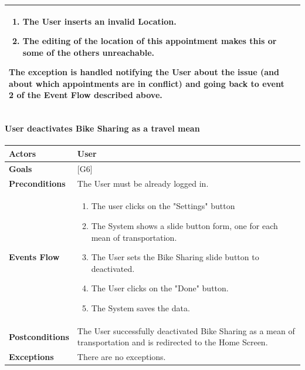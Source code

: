 \documentclass[12pt]{article}
\begin{document}
\begin{center}
\begin{tabular} { |p{}|p{}| }
\begin{enumerate}[topsep=0pt]
                            \setlength{\itemsep}{0.5pt}
                            \item The User inserts an invalid Location.
                            \item The editing of the location of this appointment makes this or some of the others unreachable.
                            \end{enumerate} 
                            The exception is handled notifying the User about the issue (and about which appointments are in conflict) and going back to event 2 of the Event Flow described above.\\ 
        \hline
    \end{tabular}
\end{center}

\newpage

\paragraph{User deactivates Bike Sharing as a travel mean}
\begin{center}
    \begin{tabular} { |p{}|p{}| }
        \hline
        \textbf{Actors} & User \\ 
        \hline
        \textbf{Goals} & {[G6]} \\ 
        \hline  
        \textbf{Preconditions} & The User must be already logged in. \\ 
        \hline
        \textbf{Events Flow} & \begin{enumerate}[topsep=0pt] 
                            \setlength{\itemsep}{0.5pt}
                            \item The user clicks on the "Settings" button
                            \item The System shows a slide button form, one for each mean of transportation.
                            \item The User sets the Bike Sharing slide button to deactivated.
                            \item The User clicks on the "Done" button.
                            \item The System saves the data.
                            \end{enumerate} \\
        \hline
        \textbf{Postconditions} & The User successfully deactivated Bike Sharing as a mean of transportation and is redirected to the Home Screen. \\
        \hline
        \textbf{Exceptions} & There are no exceptions.\\ 
        \hline
     \end{tabular}
\end{center}
\end{document}
